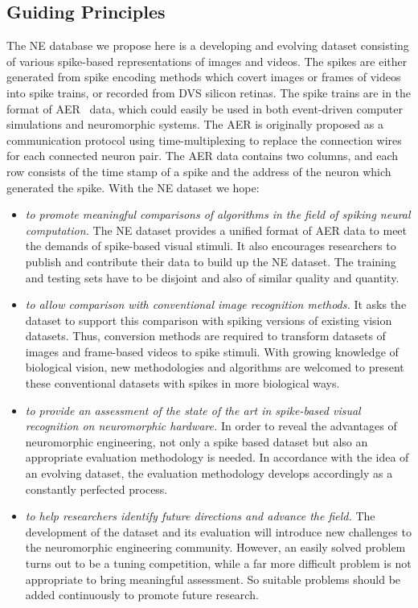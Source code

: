 \documentclass{frontiersENG} %
\begin{document}
\subsection{Guiding Principles}
The NE database we propose here is a developing and evolving dataset consisting of various spike-based representations of images and videos.
The spikes are either generated from spike encoding methods which covert images or frames of videos into spike trains, or recorded from DVS silicon retinas.
The spike trains are in the format of AER~\citep{mahowald1992vlsi} data, which could easily be used in both event-driven computer simulations and neuromorphic systems.
The AER is originally proposed as a communication protocol using time-multiplexing to replace the connection wires for each connected neuron pair.
The AER data contains two columns, and each row consists of the time stamp of a spike and the address of the neuron which generated the spike.
With the NE dataset we hope:
\begin{itemize}
	\item \textit{to promote meaningful comparisons of algorithms in the field of spiking neural computation.}
	The NE dataset provides a unified format of AER data to meet the demands of spike-based visual stimuli.
	It also encourages researchers to publish and contribute their data to build up the NE dataset.
	The training and testing sets have to be disjoint and also of similar quality and quantity.
	\item \textit{to allow comparison with conventional image recognition methods.}
	It asks the dataset to support this comparison with spiking versions of existing vision datasets.
	Thus, conversion methods are required to transform datasets of images and frame-based videos to spike stimuli.
	With growing knowledge of biological vision, new methodologies and algorithms are welcomed to present these conventional datasets with spikes in more biological ways.
	\item \textit{to provide an assessment of the state of the art in spike-based visual recognition on neuromorphic hardware.}
	In order to reveal the advantages of neuromorphic engineering, not only a spike based dataset but also an appropriate evaluation methodology is needed.
	In accordance with the idea of an evolving dataset, the evaluation methodology develops accordingly as a constantly perfected process.
	\item \textit{to help researchers identify future directions and advance the field.}
	The development of the dataset and its evaluation will introduce new challenges to the neuromorphic engineering community.
	However, an easily solved problem turns out to be a tuning competition, while a far more difficult problem is not appropriate to bring meaningful assessment.
	So suitable problems should be added continuously to promote future research.  
\end{itemize}
\end{document}
